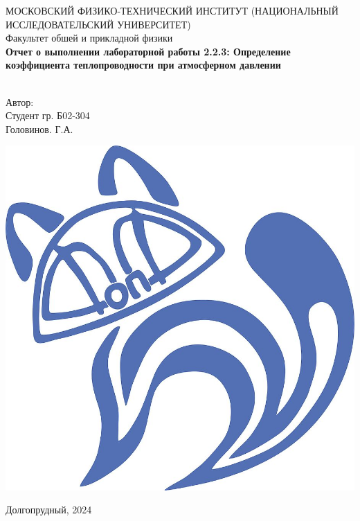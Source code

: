 \begin{titlepage}
	\begin{center}
		МОСКОВСКИЙ ФИЗИКО-ТЕХНИЧЕСКИЙ ИНСТИТУТ (НАЦИОНАЛЬНЫЙ ИССЛЕДОВАТЕЛЬСКИЙ УНИВЕРСИТЕТ) \\
		
		
		\hfill \break
		Факультет обшей и прикладной физики\\
		\vspace{2.5cm}
		\large{\textbf{Отчет о выполнении лабораторной работы 2.2.3: Определение коэффициента теплопроводности при атмосферном давлении}}\\
		\hfill \break
		\\
	\end{center}
	
	\begin{flushright}
		Автор:\\
		Студент гр. Б02-304\\
		Головинов. Г.А.
	\end{flushright}
	
	\vfill
	
	\begin{center}
		\includegraphics[width=0.15\linewidth]{uni}
	\end{center}
	
	
	
	
	\vfill
	
	\begin{center} Долгопрудный, 2024 \end{center}
	
	\thispagestyle{empty}
	
\end{titlepage}